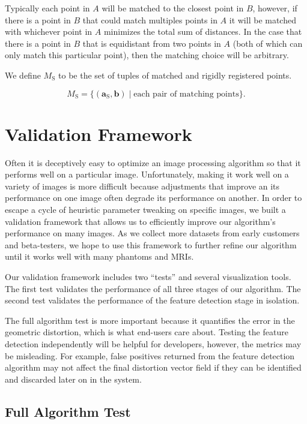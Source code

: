 \documentclass[12pt]{article}
\begin{document}
Typically each point in $A$ will be matched to the closest point in $B$, however, if there is a point in $B$ that could match multiples points in $A$ it will be matched with whichever point in $A$ minimizes the total sum of distances.  In the case that there is a point in $B$ that is equidistant from two points in $A$ (both of which can only match this particular point), then the matching choice will be arbitrary.

We define $M_\textrm{S}$ to be the set of tuples of matched and rigidly registered points.

$$
M_\textrm{S} = \{ (\mathbf{a}_\textrm{S}, \mathbf{b}) \; | \; \textrm{each pair of matching points} \}.
$$

\section{Validation Framework}

Often it is deceptively easy to optimize an image processing algorithm so that it performs well on a particular image. Unfortunately, making it work well on a variety of images is more difficult because adjustments that improve an its performance on one image often degrade its performance on another.  In order to escape a cycle of heuristic parameter tweaking on specific images, we built a validation framework that allows us to efficiently improve our algorithm's performance on many images.  As we collect more datasets from early customers and beta-testers, we hope to use this framework to further refine our algorithm until it works well with many phantoms and MRIs.

Our validation framework includes two ``tests'' and several visualization tools.  The first test validates the performance of all three stages of our algorithm.  The second test validates the performance of the feature detection stage in isolation.

The full algorithm test is more important because it quantifies the error in the geometric distortion, which is what end-users care about.  Testing the feature detection independently will be helpful for developers, however, the metrics may be misleading.  For example, false positives returned from the feature detection algorithm may not affect the final distortion vector field if they can be identified and discarded later on in the system.

\subsection{Full Algorithm Test}
\end{document}
